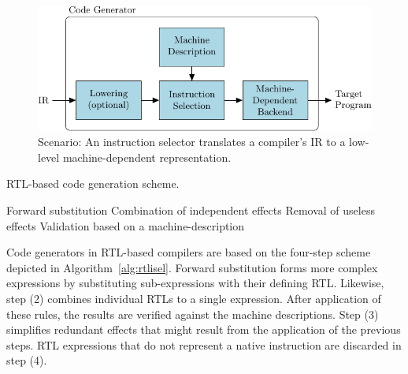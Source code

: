 \begin{figure}[t]
  \begin{center}



    \includegraphics{pgf-fig001}
  \end{center}
  \caption{Scenario: An instruction selector translates a compiler's IR to a
    low-level machine-dependent representation.}
  \label{fig:instruction-selection}
\end{figure}


\begin{algorithm}
\caption{RTL-based code generation scheme.}
\label{alg:rtlisel}
\begin{algorithmic}[1]
\STATE Forward substitution
\STATE Combination of independent effects
\STATE Removal of useless effects
\STATE Validation based on a machine-description
\end{algorithmic}
\end{algorithm}
Code generators in RTL-based compilers are based on the four-step
scheme depicted in Algorithm~\ref{alg:rtlisel}. Forward substitution
forms more complex expressions by substituting sub-expressions with
their defining RTL. Likewise, step (2) combines individual RTLs to a
single expression. After application of these rules, the results are
verified against the machine descriptions. Step (3) simplifies
redundant effects that might result from the application of the
previous steps. RTL expressions that do not represent a native
instruction are discarded in step (4).


